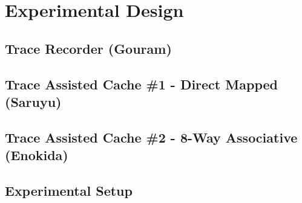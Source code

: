 \chapter{Experimental Design}
\label{chap:experimental-design}

\section{Trace Recorder (Gouram)}

\section{Trace Assisted Cache \#1 - Direct Mapped (Saruyu)}

\section{Trace Assisted Cache \#2 - 8-Way Associative (Enokida)}

\section{Experimental Setup}

